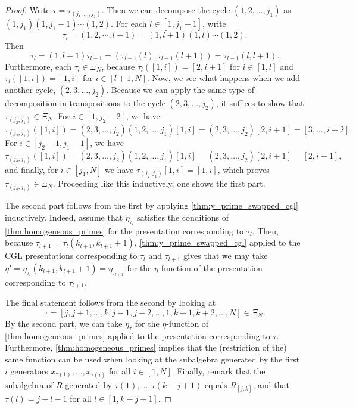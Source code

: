 \begin{proof}

	Write $\tau = \tau_{(j_k, \dots, j_1)}$. Then we can decompose the cycle $(1,2,\dots,
		j_1)$ as $(1, j_1)(1, j_1 - 1)\cdots (1, 2)$. For each $l \in [1, j_1 - 1]$, write
	\begin{equation*}
		\tau_l = (1,2,\cdots, l+1) = (1, l+1) (1, l) \cdots (1, 2).
	\end{equation*}
	Then
	\begin{equation*}
		\tau_l = (1, l+1)\tau_{l-1} = (\tau_{l-1}(l), \tau_{l-1}(l+1)) = \tau_{l-1}(l, l+1).
	\end{equation*}
	Furthermore, each $\tau_l \in \Xi_N$, because $\tau_l ([1, i]) = [2, i+1]$ for $i \in
		[1, l]$ and $\tau_l ([1, i]) = [1, i]$ for $i \in [l+1, N]$. Now, we see what happens
	when we add another cycle, $(2,3,\dots, j_2)$. Because we can apply the same type of
	decomposition in transpositions to the cycle $(2,3,\dots, j_2)$, it suffices to show
	that $\tau_{(j_2, j_1)} \in \Xi_N$. For $i \in [1, j_2 - 2]$, we have
	\begin{equation*}
		\tau_{(j_2, j_1)}([1, i]) = (2,3, \dots, j_2)(1,2,\dots,j_1)[1, i]= (2,3,\dots,j_2)[2, i+1] = [3,\dots,i+2].
	\end{equation*}
	For $i \in [j_2 - 1, j_1 -1]$, we have
	\begin{equation*}
		\tau_{(j_2,j_1)}([1, i]) = (2,3,\dots, j_2)(1,2, \dots, j_1)[1, i] = (2,3,\dots,j_2)[2,i+1] = [2, i+1],
	\end{equation*}
	and finally, for $i \in [j_1, N]$ we have $\tau_{(j_2,j_1)}[1,i] = [1, i]$, which proves $\tau_{(j_2, j_1)} \in \Xi_N$. Proceeding like this inductively, one shows the first part.

	The second part follows from the first by applying \cref{thm:y_prime_swapped_cgl}
	inductively. Indeed, assume that $\eta_{\tau_l}$ satisfies the conditions of
	\cref{thm:homogeneous_primes} for the presentation corresponding to $\tau_l$. Then,
	because $\tau_{l+1} = \tau_l (k_{l+1}, k_{l+1} + 1)$, \cref{thm:y_prime_swapped_cgl}
	applied to the CGL presentations corresponding to $\tau_{l}$ and $\tau_{l+1}$ gives
	that we may take $\eta' = \eta_{\tau_l}(k_{l+1}, k_{l+1}+1) = \eta_{\tau_{l+1}}$ for
	the $\eta$-function of the presentation corresponding to $\tau_{l+1}$.

	The final statement follows from the second by looking at
	\begin{equation*}
		\tau = [j, j+1, \dots, k, j-1,j-2, \dots , 1, k+1, k+2, \dots, N] \in \Xi_N.
	\end{equation*}
	By the second part, we can take $\eta_\tau$ for the $\eta$-function of
	\cref{thm:homogeneous_primes} applied to the presentation corresponding to $\tau$.
	Furthermore, \cref{thm:homogeneous_primes} implies that the (restriction of the) same
	function can be used when looking at the subalgebra generated by the first $i$
	generators $x_{\tau(1)}, \dots, x_{\tau(i)}$ for all $i \in [1, N]$. Finally, remark
	that the subalgebra of $R$ generated by $\tau(1), \dots, \tau(k - j + 1)$ equals
	$R_{[j, k]}$, and that $\tau(l) = j + l - 1$ for all $l \in [1, k- j + 1]$.

\end{proof}

